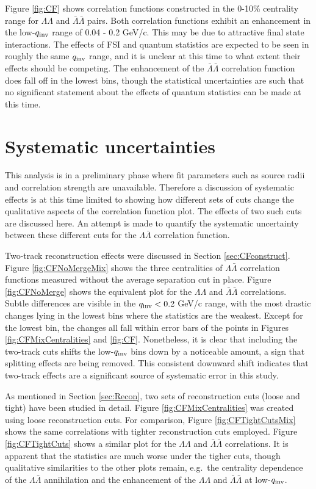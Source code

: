 {Figure \ref{fig:CF} shows correlation functions constructed in the 0-10\% centrality range for $\Lambda\Lambda$ and $\bar{\Lambda}\bar{\Lambda}$ pairs.  Both correlation functions exhibit an enhancement in the low-$q_{\rm inv}$ range of 0.04 - 0.2 GeV/c.  This may be due to attractive final state interactions.  The effects of FSI and quantum statistics are expected to be seen in roughly the same $q_{\rm inv}$ range, and it is unclear at this time to what extent their effects should be competing. The enhancement of the $\bar{\Lambda}\bar{\Lambda}$ correlation function does fall off in the lowest bins, though the statistical uncertainties are such that no significant statement about the effects of quantum statistics can be made at this time.

\section{Systematic uncertainties}
\label{sec:Systematics}

This analysis is in a preliminary phase where fit parameters such as source radii and correlation strength are unavailable.  Therefore a discussion of systematic effects is at this time limited to showing how different sets of cuts change the qualitative aspects of the correlation function plot.  The effects of two such cuts are discussed here.  An attempt is made to quantify the systematic uncertainty between these different cuts for the $\Lambda\bar{\Lambda}$ correlation function.

Two-track reconstruction effects were discussed in Section \ref{sec:CFconstruct}. Figure \ref{fig:CFNoMergeMix} shows the three centralities of $\Lambda\bar{\Lambda}$ correlation functions measured without the average separation cut in place.  Figure \ref{fig:CFNoMerge} shows the equivalent plot for the $\Lambda\Lambda$ and $\bar{\Lambda}\bar{\Lambda}$ correlations. Subtle differences are visible in the $q_{\rm inv} < 0.2$ GeV/c range, with the most drastic changes lying in the lowest bins where the statistics are the weakest.  Except for the lowest bin, the changes all fall within error bars of the points in Figures \ref{fig:CFMixCentralities} and \ref{fig:CF}.  Nonetheless, it is clear that including the two-track cuts  shifts the low-$q_{\rm inv}$ bins down by a noticeable amount, a sign that splitting effects are being removed.  This consistent downward shift indicates that two-track effects are a significant source of systematic error in this study.

As mentioned in Section \ref{sec:Recon}, two sets of reconstruction cuts (loose and tight) have been studied in detail.  Figure \ref{fig:CFMixCentralities} was created using loose reconstruction cuts.  For comparison, Figure \ref{fig:CFTightCutsMix} shows the same correlations with tighter reconstruction cuts employed.  Figure \ref{fig:CFTightCuts} shows a similar plot for the $\Lambda\Lambda$ and $\bar{\Lambda}\bar{\Lambda}$ correlations.  It is apparent that the statistics are much worse under the tigher cuts, though qualitative similarities to the other plots remain, e.g.\ the centrality dependence of the $\Lambda\bar{\Lambda}$ annihilation and the enhancement of the $\Lambda\Lambda$ and $\bar{\Lambda}\bar{\Lambda}$ at low-$q_{\rm inv}$.

}

